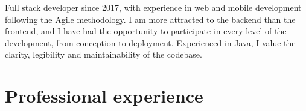 \documentclass[letterpaper]{twentysecondcv} %
\begin{document}
\vspace{3mm}

Full stack developer since 2017, with experience in web and mobile development following the Agile methodology.
I am more attracted to the backend than the frontend, and I have had the opportunity to participate in every level of the development,
from conception to deployment. Experienced in Java, I value the clarity, legibility and maintainability of the codebase.



\vspace{3mm}

\section{Professional experience}
\end{document}

